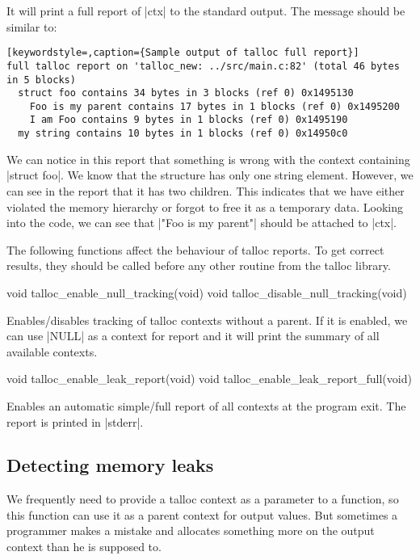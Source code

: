 \noindent
It will print a full report of |ctx| to the standard output. The message should
be similar to:

\begin{lstlisting}[keywordstyle=,caption={Sample output of talloc full report}]
full talloc report on 'talloc_new: ../src/main.c:82' (total 46 bytes in 5 blocks)
  struct foo contains 34 bytes in 3 blocks (ref 0) 0x1495130
    Foo is my parent contains 17 bytes in 1 blocks (ref 0) 0x1495200
    I am Foo contains 9 bytes in 1 blocks (ref 0) 0x1495190
  my string contains 10 bytes in 1 blocks (ref 0) 0x14950c0
\end{lstlisting}

\noindent
We can notice in this report that something is wrong with the context containing
|struct foo|. We know that the structure has only one string element. However,
we can see in the report that it has two children. This indicates that we have
either violated the memory hierarchy or forgot to free it as a temporary data.
Looking into the code, we can see that |"Foo is my parent"| should be attached
to |ctx|.

The following functions affect the behaviour of talloc reports. To get correct
results, they should be called before any other routine from the talloc library.

\begin{funcproto}
void talloc_enable_null_tracking(void)
void talloc_disable_null_tracking(void)
\end{funcproto}
\begin{funcdesc}
Enables/disables tracking of talloc contexts without a parent. If it is enabled,
we can use |NULL| as a context for report and it will print the summary of all
available contexts.
\end{funcdesc}

\begin{funcproto}
void talloc_enable_leak_report(void)
void talloc_enable_leak_report_full(void)
\end{funcproto}
\begin{funcdesc}
  Enables an automatic simple/full report of all contexts at the program exit.
  The report is printed in |stderr|.
\end{funcdesc}

\subsection{Detecting memory leaks}

We frequently need to provide a talloc context as a parameter to a function, so
this function can use it as a parent context for output values. But sometimes a
programmer makes a mistake and allocates something more on the output context
than he is supposed to.

